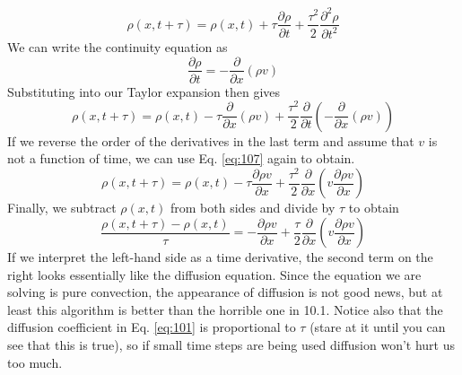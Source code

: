 \begin{equation}\label{eq:106}
\rho(x, t+\tau)=\rho(x, t)+\tau \frac{\partial \rho}{\partial t}+\frac{\tau^{2}}{2} \frac{\partial^{2} \rho}{\partial t^{2}}
\end{equation}
We can write the continuity equation as
\begin{equation}\label{eq:107}
\frac{\partial \rho}{\partial t}=-\frac{\partial}{\partial x}(\rho v)
\end{equation}
Substituting into our Taylor expansion then gives
\begin{equation}\label{eq:108}
\rho(x, t+\tau)=\rho(x, t)-\tau \frac{\partial}{\partial x}(\rho v)+\frac{\tau^{2}}{2} \frac{\partial}{\partial t}\left(-\frac{\partial}{\partial x}(\rho v)\right)
\end{equation}
If we reverse the order of the derivatives in the last term and assume that $v$ is not
a function of time, we can use Eq. \eqref{eq:107} again to obtain.
\begin{equation}\label{eq:109}
\rho(x, t+\tau)=\rho(x, t)-\tau \frac{\partial \rho v}{\partial x}+\frac{\tau^{2}}{2} \frac{\partial}{\partial x}\left(v \frac{\partial \rho v}{\partial x}\right)
\end{equation}
Finally, we subtract $ρ(x,t)$ from both sides and divide by $\tau$ to obtain
\begin{equation}\label{eq:1010}
\frac{\rho(x, t+\tau)-\rho(x, t)}{\tau}=-\frac{\partial \rho v}{\partial x}+\frac{\tau}{2} \frac{\partial}{\partial x}\left(v \frac{\partial \rho v}{\partial x}\right)
\end{equation}
If we interpret the left-hand side as a time derivative, the second term on the right looks essentially like the diffusion equation. Since the equation we are solving is pure convection, the appearance of diffusion is not good news, but at least this algorithm is better than the horrible one in 10.1. Notice also that the diffusion coefficient in Eq. \eqref{eq:101} is proportional to $\tau$ (stare at it until you can see that this is true), so if small time steps are being used diffusion won't hurt us too much.

